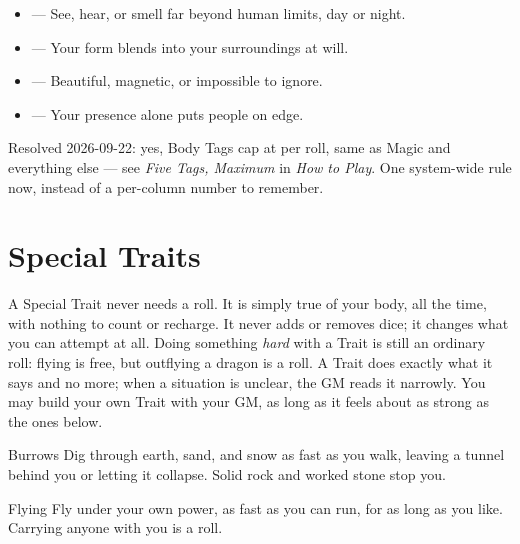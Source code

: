 \begin{itemize}
  \item {} --- See, hear, or smell far beyond human limits, day or night.
  \item {} --- Your form blends into your surroundings at will.
\end{itemize}

\begin{itemize}
  \item {} --- Beautiful, magnetic, or impossible to ignore.
  \item {} --- Your presence alone puts people on edge.
\end{itemize}

\begin{notebox}
Resolved 2026-09-22: yes, Body Tags cap at  per roll, same as
Magic and everything else --- see \emph{Five Tags, Maximum} in
\emph{How to Play}. One system-wide rule now, instead of a per-column
number to remember.
\end{notebox}

\section{Special Traits}

A Special Trait never needs a roll. It is simply true of your body, all
the time, with nothing to count or recharge. It never adds or removes
dice; it changes what you can attempt at all. Doing something
\emph{hard} with a Trait is still an ordinary roll: flying is free, but
outflying a dragon is a  roll. A Trait does exactly what
it says and no more; when a situation is unclear, the GM reads it
narrowly. You may build your own Trait with your GM, as long as it feels
about as strong as the ones below.

\begin{feat}{Burrows}
Dig through earth, sand, and snow as fast as you walk, leaving a tunnel
behind you or letting it collapse. Solid rock and worked stone stop you.
\end{feat}

\begin{feat}{Flying}
Fly under your own power, as fast as you can run, for as long as you
like. Carrying anyone with you is a  roll.
\end{feat}

